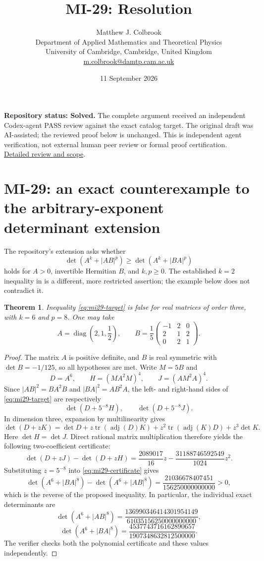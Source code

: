 \documentclass[10pt,a4paper]{article}
\title{MI-29: Resolution}
\author{Matthew J. Colbrook\\
\small Department of Applied Mathematics and Theoretical Physics\\
\small University of Cambridge, Cambridge, United Kingdom\\
\small\href{mailto:m.colbrook@damtp.cam.ac.uk}{m.colbrook@damtp.cam.ac.uk}}
\date{11 September 2026}
\newtheorem{theorem}{Theorem}[section]
\theoremstyle{remark}
\newcommand{\tr}{\operatorname{tr}}
\newcommand{\diag}{\operatorname{diag}}
\begin{document}
\maketitle
\textbf{Repository status: Solved.}
The complete argument received an independent Codex-agent PASS review
against the exact catalog target.
The original draft was AI-assisted; the reviewed proof below is unchanged.
This is independent agent verification, not external human peer review or
formal proof certification. \href{https://github.com/ajt60gaibb/OpenProblemsInNLA/blob/main/references/colbrook-matrix-2026-09-11/verification/reviews/MI-29-review.md}{Detailed review and scope}.
\par\medskip
\section{MI-29: an exact counterexample to the arbitrary-exponent determinant extension}
\label{sec:mi29}
The repository's extension asks whether
\begin{equation}\label{eq:mi29-target}
 \det(A^k+|AB|^p)\geq\det(A^k+|BA|^p)
\end{equation}
holds for $A>0$, invertible Hermitian $B$, and $k,p\geq0$. The established $k=2$ inequality in \cite{GAM2020} is a different, more restricted assertion; the example below does not contradict it.

\begin{theorem}
Inequality \eqref{eq:mi29-target} is false for real matrices of order three, with $k=6$ and $p=8$. One may take
\[
 A=\diag\left(2,1,\frac12\right),\qquad
 B=\frac15\begin{pmatrix}-1&2&0\\2&1&2\\0&2&1\end{pmatrix}.
\]
\end{theorem}
\begin{proof}
The matrix $A$ is positive definite, and $B$ is real symmetric with $\det B=-1/125$, so all hypotheses are met. Write $M=5B$ and
\[
 D=A^6,\qquad H=(MA^2M)^4,\qquad J=(AM^2A)^4.
\]
Since $|AB|^2=BA^2B$ and $|BA|^2=AB^2A$, the left- and right-hand sides of \eqref{eq:mi29-target} are respectively
\[
 \det(D+5^{-8}H),\qquad\det(D+5^{-8}J).
\]
In dimension three, expansion by multilinearity gives
\[
 \det(D+zK)=\det D+z\tr(\operatorname{adj}(D)K)
   +z^2\tr(\operatorname{adj}(K)D)+z^3\det K.
\]
Here $\det H=\det J$. Direct rational matrix multiplication therefore yields the following two-coefficient certificate:
\begin{equation}\label{eq:mi29-certificate}
 \det(D+zJ)-\det(D+zH)
 =\frac{2089017}{16}z-\frac{31188746592549}{1024}z^2.
\end{equation}
Substituting $z=5^{-8}$ into \eqref{eq:mi29-certificate} gives
\[
 \det(A^6+|BA|^8)-\det(A^6+|AB|^8)
 =\frac{21036678407451}{156250000000000}>0,
\]
which is the reverse of the proposed inequality. In particular, the individual exact determinants are
\[
 \det(A^6+|AB|^8)=\frac{136990346414301954149}{61035156250000000000},
\]
\[
 \det(A^6+|BA|^8)=\frac{4537743716162890657}{1907348632812500000}.
\]
The verifier checks both the polynomial certificate and these values independently.
\end{proof}
\end{document}

